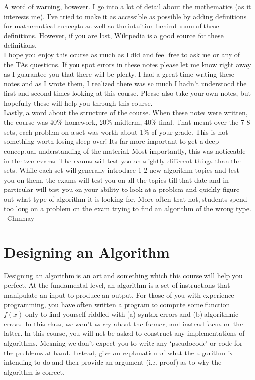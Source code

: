 \documentclass[11pt]{article}
\theoremstyle{plain}
\theoremstyle{definition}
\numberwithin{equation}{section}
\numberwithin{figure}{section}
\begin{document}
\noindent A word of warning, however. I go into a lot of detail about the mathematics (as it interests me). I've tried to make it as accessible as possible by adding definitions for mathematical concepts as well as the intuition behind some of these definitions. However, if you are lost, Wikipedia is a good source for these definitions. \\

\noindent I hope you enjoy this course as much as I did and feel free to ask me or any of the TAs questions. If you spot errors in these notes please let me know right away as I guarantee you that there will be plenty. I had a great time writing these notes and as I wrote them, I realized there was so much I hadn't understood the first and second times looking at this course. Please also take your own notes, but hopefully these will help you through this course. \\

\noindent Lastly, a word about the structure of the course. When these notes were written, the course was 40\% homework, 20\% midterm, 40\% final. That meant over the 7-8 sets, each problem on a set was worth about 1\% of your grade. This is not something worth losing sleep over! Its far more important to get a deep conceptual understanding of the material. Most importantly, this was noticeable in the two exams. The exams will test you on slightly different things than the sets. While each set will generally introduce 1-2 new algorithm topics and test you on them, the exams will test you on all the topics till that date and in particular will test you on your ability to look at a problem and quickly figure out what type of algorithm it is looking for. More often that not, students spend too long on a problem on the exam trying to find an algorithm of the wrong type. \\

\noindent --Chinmay


\newpage

\section{Designing an Algorithm}

\noindent Designing an algorithm is an art and something which this course will help you perfect. At the fundamental level, an algorithm is a set of instructions that manipulate an input to produce an output. For those of you with experience programming, you have often written a program to compute some function $f(x)$ only to find yourself riddled with (a) syntax errors and (b) algorithmic errors. In this class, we won't worry about the former, and instead focus on the latter. In this course, you will not be asked to construct any implementations of algorithms. Meaning we don't expect you to write any `pseudocode' or code for the problems at hand. Instead, give an explanation of what the algorithm is intending to do and then provide an argument (i.e. proof) as to why the algorithm is correct. \\
\end{document}
